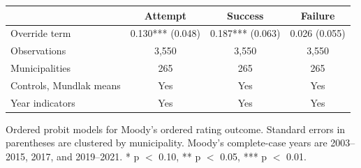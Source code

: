 \begin{center}
\scriptsize
\begin{tabular}{lccc}
\toprule
 & Attempt & Success & Failure \\
\midrule
Override term & 0.130*** (0.048) & 0.187*** (0.063) & 0.026 (0.055) \\
Observations & 3,550 & 3,550 & 3,550 \\
Municipalities & 265 & 265 & 265 \\
Controls, Mundlak means & Yes & Yes & Yes \\
Year indicators & Yes & Yes & Yes \\
\bottomrule
\end{tabular}
\vspace{0.05cm}
\parbox{0.94\textwidth}{\tiny Ordered probit models for Moody's ordered rating outcome. Standard errors in parentheses are clustered by municipality. Moody's complete-case years are 2003--2015, 2017, and 2019--2021. * p $<$ 0.10, ** p $<$ 0.05, *** p $<$ 0.01.}
\end{center}
